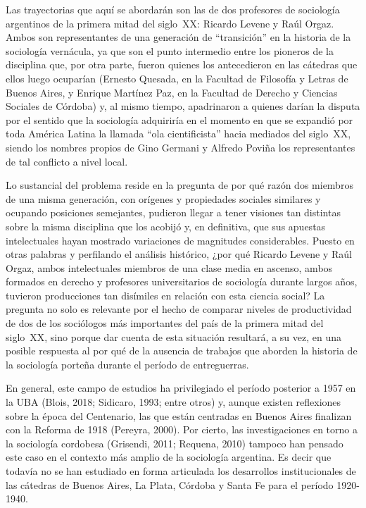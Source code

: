Las trayectorias que aquí se abordarán son las de dos profesores de sociología argentinos de la primera mitad del siglo~XX: Ricardo Levene y Raúl Orgaz. Ambos son representantes de una generación de \enquote{transición} en la historia de la sociología vernácula, ya que son el punto intermedio entre los pioneros de la disciplina que, por otra parte, fueron quienes los antecedieron en las cátedras que ellos luego ocuparían (Ernesto Quesada, en la Facultad de Filosofía y Letras de Buenos Aires, y Enrique Martínez Paz, en la Facultad de Derecho y Ciencias Sociales de Córdoba) y, al mismo tiempo, apadrinaron a quienes darían la disputa por el sentido que la sociología adquiriría en el momento en que se expandió por toda América Latina la llamada \enquote{ola cientificista} hacia mediados del siglo~XX, siendo los nombres propios de Gino Germani y Alfredo Poviña los representantes de tal conflicto a nivel local.

Lo sustancial del problema reside en la pregunta de por qué razón dos miembros de una misma generación, con orígenes y propiedades sociales similares y ocupando posiciones semejantes, pudieron llegar a tener visiones tan distintas sobre la misma disciplina que los acobijó y, en definitiva, que sus apuestas intelectuales hayan mostrado variaciones de magnitudes considerables. Puesto en otras palabras y perfilando el análisis histórico, ¿por qué Ricardo Levene y Raúl Orgaz, ambos intelectuales miembros de una clase media en ascenso, ambos formados en derecho y profesores universitarios de sociología durante largos años, tuvieron producciones tan disímiles en relación con esta ciencia social? La pregunta no solo es relevante por el hecho de comparar niveles de productividad de dos de los sociólogos más importantes del país de la primera mitad del siglo~XX, sino porque dar cuenta de esta situación resultará, a su vez, en una posible respuesta al por qué de la ausencia de trabajos que aborden la historia de la sociología porteña durante el período de entreguerras.

En general, este campo de estudios ha privilegiado el período posterior a 1957 en la UBA \parencite[por ejemplo][]{1450-VERON1974}(Blois, 2018; Sidicaro, 1993; entre otros) y, aunque existen reflexiones sobre la época del Centenario, las que están centradas en Buenos Aires finalizan con la Reforma de 1918 (Pereyra, 2000). Por cierto, las investigaciones en torno a la sociología cordobesa \parencite[por ejemplo]{1447-CARACCIOLO2010}(Grisendi, 2011; Requena, 2010) tampoco han pensado este caso en el contexto más amplio de la sociología argentina. Es decir que todavía no se han estudiado en forma articulada los desarrollos institucionales de las cátedras de Buenos Aires, La Plata, Córdoba y Santa Fe para el período 1920-1940.


